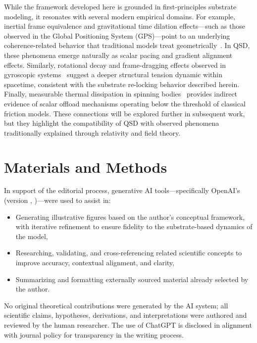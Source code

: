 \documentclass[entropy,article,submit,pdftex,moreauthors]{Definitions/mdpi}
\begin{document}
While the framework developed here is grounded in first-principles substrate modeling, it resonates with several modern empirical domains. For example, inertial frame equivalence and gravitational time dilation effects—such as those observed in the Global Positioning System (GPS)—point to an underlying coherence-related behavior that traditional models treat geometrically~\cite{ashby-gps}. In QSD, these phenomena emerge naturally as scalar pacing and gradient alignment effects. Similarly, rotational decay and frame-dragging effects observed in gyroscopic systems~\cite{gp-b} suggest a deeper structural tension dynamic within spacetime, consistent with the substrate re-locking behavior described herein. Finally, measurable thermal dissipation in spinning bodies~\cite{rotational-heating} provides indirect evidence of scalar offload mechanisms operating below the threshold of classical friction models. These connections will be explored further in subsequent work, but they highlight the compatibility of QSD with observed phenomena traditionally explained through relativity and field theory.



\section{Materials and Methods}
\qsdmethodstatement
In support of the editorial process, generative AI tools—specifically OpenAI's \qsdgptname (version \qsdgptver, \qsdgptyear)—were used to assist in:
\begin{itemize}
    \item Generating illustrative figures based on the author’s conceptual framework, with iterative refinement to ensure fidelity to the substrate-based dynamics of the model,
    \item Researching, validating, and cross-referencing related scientific concepts to improve accuracy, contextual alignment, and clarity,
    \item Summarizing and formatting externally sourced material already selected by the author.
\end{itemize}

No original theoretical contributions were generated by the AI system; all scientific claims, hypotheses, derivations, and interpretations were authored and reviewed by the human researcher. The use of ChatGPT is disclosed in alignment with journal policy for transparency in the writing process.
\end{document}
